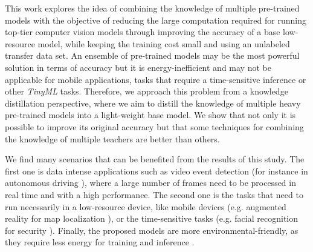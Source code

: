 This work explores the idea of combining the knowledge of multiple pre-trained models with the objective of reducing the large computation required for running top-tier computer vision models through improving the accuracy of a base low-resource model, while keeping the training cost small and using an unlabeled transfer data set. 	An ensemble of pre-trained models may be the most powerful solution in terms of accuracy but it is energy-inefficient and may not be applicable for mobile applications, tasks that require a time-sensitive inference \cite{sanchez2020} or other \textit{TinyML} tasks. Therefore, we approach this problem from a knowledge distillation perspective, where we aim to distill the knowledge of multiple heavy pre-trained models into a light-weight base model. We show that not only it is possible to improve its original accuracy but that some techniques for combining the knowledge of multiple teachers are better than others.

We find many scenarios that can be benefited from the results of this study. The first one is data intense applications such as video event detection \cite{chakraborty2021} (for instance in autonomous driving \cite{swaminathan2019}), where a large number of frames need to be processed in real time and with a high performance. The second one is the tasks that need to run necessarily in a low-resource device, like mobile devices (e.g. augmented reality for map localization \cite{limmer2017}), or the time-sensitive tasks (e.g. facial recognition for security \cite{aung2021}). Finally, the proposed models are more environmental-friendly, as they require less energy for training and inference \cite{wu2022sustainable}.

